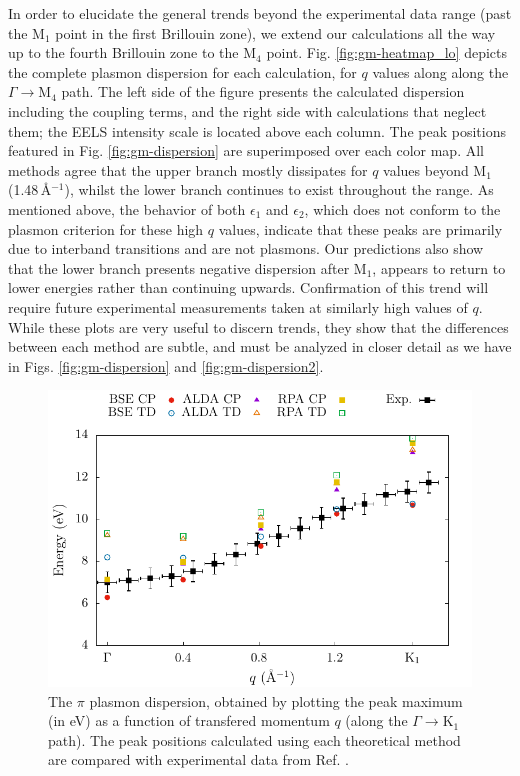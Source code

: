 \documentclass[aps,prb,10pt,showpacs,superscriptaddress,twocolumn,notitlepage]{revtex4-1}
\begin{document}
In order to elucidate the general trends beyond the experimental data range
(past the M$_{1}$ point in the first Brillouin zone), we extend our calculations
all the way up to the fourth Brillouin zone to the M$_{4}$ point. Fig.
\ref{fig:gm-heatmap_lo} depicts the complete plasmon dispersion for each
calculation, for $q$ values along along the $\Gamma \rightarrow
\mathrm{M}_{4}$ path. The left side of the figure presents the calculated
dispersion including the coupling terms, and the right side with calculations
that neglect them; the EELS intensity scale is located above each column. The
peak positions featured in Fig. \ref{fig:gm-dispersion} are superimposed over
each color map. All methods agree that the upper branch mostly dissipates for
$q$ values beyond M$_{1}$ (1.48\,\r{A}$^{-1}$), whilst the lower branch
continues to exist throughout the range. As mentioned above, the behavior of
both $\epsilon_{1}$ and $\epsilon_{2}$, which does not conform to the plasmon
criterion for these high $q$ values, indicate that these peaks are primarily due
to interband transitions and are not plasmons. Our predictions also show that
the lower branch presents negative dispersion after M$_{1}$, appears to return
to lower energies rather than continuing upwards. Confirmation of this trend
will require future experimental measurements taken at similarly high values of
$q$. While these plots are very useful to discern trends, they show that the
differences between each method are subtle, and must be analyzed in closer
detail as we have in Figs. \ref{fig:gm-dispersion} and \ref{fig:gm-dispersion2}.

\begin{figure}[b]
\includegraphics[width=\linewidth]{fig07}
\caption{
The $\pi$ plasmon dispersion, obtained by plotting the peak maximum (in eV) as
a function of transfered momentum $q$ (along the $\Gamma \rightarrow
\mathrm{K}_{1}$ path). The peak positions calculated using each theoretical
method are compared with experimental data from Ref. .
}
\label{fig:gk-dispersion}
\end{figure}
\end{document}
